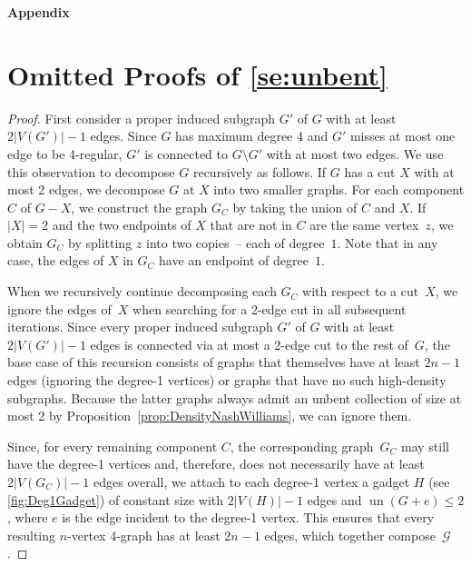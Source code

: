\documentclass[runningheads]{llncs}
\newcommand{\un}{\operatorname{un}}
\begin{document}
\clearpage

\noindent
{\sffamily\bfseries\Large Appendix}

\section{Omitted Proofs of \cref{se:unbent}}

\Decompose*
\label{lm:decompose*}

\begin{proof}
    First consider a proper induced subgraph $G'$ of $G$ with at least $2|V(G')| - 1$ edges.
    Since $G$ has maximum degree 4 and $G'$ misses at most one edge to be 4-regular, $G'$ is connected to $G \setminus G'$ with at most two edges.
    We use this observation to decompose $G$ recursively as follows.
    If $G$ has a cut $X$ with at most 2 edges, we decompose $G$ at $X$ into two smaller graphs.
    For each component $C$ of $G - X$, we construct the graph $G_C$ by
    taking the union of $C$ and $X$.
    If $|X| = 2$ and the two endpoints of $X$
    that are not in $C$ are the same vertex~$z$,
    we obtain $G_C$ by splitting $z$ into two copies~-- each of degree~$1$.
    Note that in any case, the edges of $X$ in $G_C$ have an
    endpoint of degree~$1$.

    When we recursively continue decomposing each $G_C$
    with respect to a cut~$X$,
    we ignore the edges of~$X$ when searching for a 2-edge cut in all subsequent iterations.
    Since every proper induced subgraph $G'$ of $G$ with at least $2|V(G')| -1$ edges is connected via at most a 2-edge cut to the rest of~$G$, the base case of this recursion consists of graphs that themselves have at least $2n-1$ edges (ignoring the degree-1 vertices) or graphs that have no such high-density subgraphs.
    Because the latter graphs always admit an unbent collection of size at most 2 by Proposition~\ref{prop:DensityNashWilliams}, we can ignore them.
    
    Since, for every remaining component $C$, the
    corresponding graph~$G_C$ may still have the degree-1 vertices and,
    therefore, does not necessarily have at least ${2 |V(G_C)| - 1}$ edges overall, we attach to each degree-1 vertex a gadget $H$
    (see \cref{fig:Deg1Gadget}) of constant size with $2|V(H)|-1$ edges
    and $\un(G + e) \leq 2$, where $e$ is the edge incident to the degree-1 vertex.
    This ensures that every resulting $n$-vertex 4-graph has at least $2n-1$ edges, which together compose~$\mathcal{G}$.
    

\end{proof}
\end{document}
